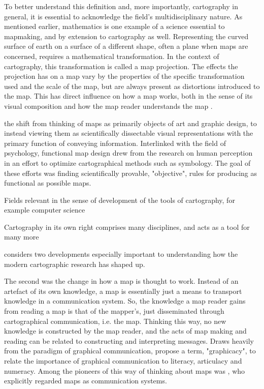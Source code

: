 To better understand this definition and,
more importantly, cartography in general,
it is essential to acknowledge the field's multidisciplinary nature.
As mentioned earlier,
mathematics is one example of a science essential to mapmaking,
and by extension to cartography as well.
Representing the curved surface of earth  %
on a surface of a different shape, often a plane when maps are concerned,
requires a mathematical transformation.
In the context of cartography, this transformation is called a map projection.  %
The effects the projection has on a map vary by
the properties of the specific transformation used and the scale of the map,
but are always present as distortions introduced to the map.
This has direct influence on how a map works, both in the sense of
its visual composition and
how the map reader understands the map \parencite{ker2018}.

the shift from thinking of maps as primarily objects of art and graphic design,
to instead viewing them as scientifically dissectable visual representations
with the primary function of conveying information.
Interlinked with the field of psychology,
functional map design drew from the research on human perception
in an effort to optimize cartographical methods such as symbology.
The goal of these efforts was finding scientifically provable, "objective", rules
for producing as functional as possible maps.

Fields relevant in the sense of development of the tools of cartography,
for example computer science \parencite{mon1985}

Cartography in its own right comprises many disciplines,
and acts as a tool for many more

\parencite{kai2020}
\textcite{mac2004} considers two developments especially important
to understanding how the modern cartographic research has shaped up.


The second was the change in how a map is thought to work.
Instead of an artefact of its own knowledge,
a map is essentially just a means to transport knowledge in a communication system.
So, the knowledge a map reader gains from reading a map is that of the mapper's,
just disseminated through cartographical communication, i.e. the map.
Thinking this way, no new knowledge is constructed by the map reader,  %
and the acts of map making and reading can be related to constructing and interpreting messages.
Draws heavily from the paradigm of graphical communication,  %
\textcite{bal1966} propose a term, "graphicacy",
to relate the importance of graphical communication to literacy, articulacy and numeracy.
Among the pioneers of this way of thinking about maps was \textcite{kol1969},
who explicitly regarded maps as communication systems.

